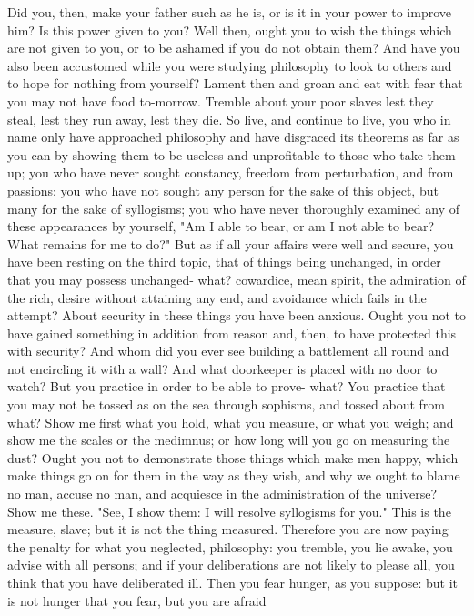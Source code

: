 \documentclass[a4paper]{article}
\begin{document}
Did you, then, make your father such as he is, or is it in your power to
improve him? Is this power given to you? Well then, ought you to wish the
things which are not given to you, or to be ashamed if you do not obtain them?
And have you also been accustomed while you were studying philosophy to look to
others and to hope for nothing from yourself? Lament then and groan and eat
with fear that you may not have food to-morrow. Tremble about your poor slaves
lest they steal, lest they run away, lest they die. So live, and continue to
live, you who in name only have approached philosophy and have disgraced its
theorems as far as you can by showing them to be useless and unprofitable to
those who take them up; you who have never sought constancy, freedom from
perturbation, and from passions: you who have not sought any person for the
sake of this object, but many for the sake of syllogisms; you who have never
thoroughly examined any of these appearances by yourself, "Am I able to bear,
or am I not able to bear? What remains for me to do?" But as if all your
affairs were well and secure, you have been resting on the third topic, that of
things being unchanged, in order that you may possess unchanged- what?
cowardice, mean spirit, the admiration of the rich, desire without attaining
any end, and avoidance which fails in the attempt? About security in these
things you have been anxious.
    Ought you not to have gained something in addition from reason and, then,
to have protected this with security? And whom did you ever see building a
battlement all round and not encircling it with a wall? And what doorkeeper is
placed with no door to watch? But you practice in order to be able to prove-
what? You practice that you may not be tossed as on the sea through sophisms,
and tossed about from what? Show me first what you hold, what you measure, or
what you weigh; and show me the scales or the medimnus; or how long will you go
on measuring the dust? Ought you not to demonstrate those things which make men
happy, which make things go on for them in the way as they wish, and why we
ought to blame no man, accuse no man, and acquiesce in the administration of
the universe? Show me these. "See, I show them: I will resolve syllogisms for
you." This is the measure, slave; but it is not the thing measured. Therefore
you are now paying the penalty for what you neglected, philosophy: you tremble,
you lie awake, you advise with all persons; and if your deliberations are not
likely to please all, you think that you have deliberated ill. Then you fear
hunger, as you suppose: but it is not hunger that you fear, but you are afraid
\end{document}
